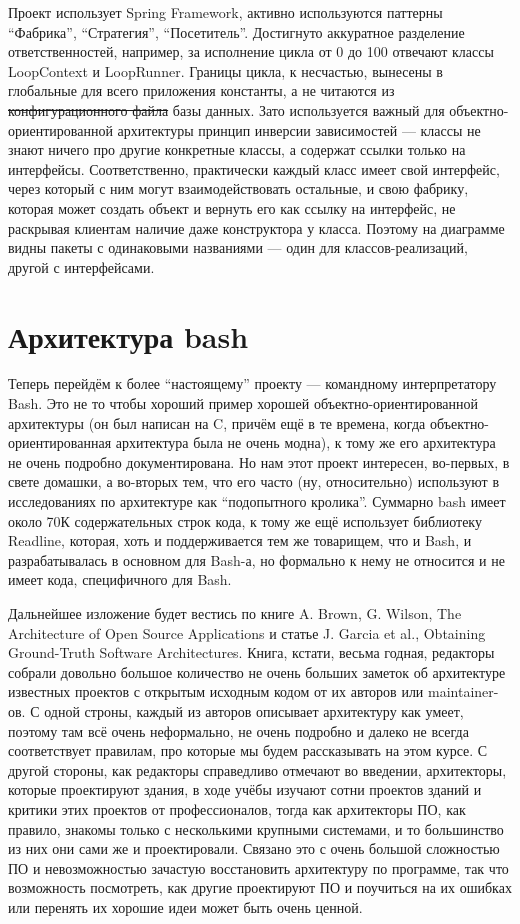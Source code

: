 \documentclass[a5paper]{article}
\begin{document}
Проект использует Spring Framework, активно используются паттерны ``Фабрика'', ``Стратегия'', ``Посетитель''. Достигнуто аккуратное разделение ответственностей, например, за исполнение цикла от 0 до 100 отвечают классы LoopContext и LoopRunner. Границы цикла, к несчастью, вынесены в глобальные для всего приложения константы, а не читаются из \sout{конфигурационного файла} базы данных. Зато используется важный для объектно-ориентированной архитектуры принцип инверсии зависимостей --- классы не знают ничего про другие конкретные классы, а содержат ссылки только на интерфейсы. Соответственно, практически каждый класс имеет свой интерфейс, через который с ним могут взаимодействовать остальные, и свою фабрику, которая может создать объект и вернуть его как ссылку на интерфейс, не раскрывая клиентам наличие даже конструктора у класса. Поэтому на диаграмме видны пакеты с одинаковыми названиями --- один для классов-реализаций, другой с интерфейсами.

\section{Архитектура bash}

Теперь перейдём к более ``настоящему'' проекту --- командному интерпретатору Bash. Это не то чтобы хороший пример хорошей объектно-ориентированной архитектуры (он был написан на C, причём ещё в те времена, когда объектно-ориентированная архитектура была не очень модна), к тому же его архитектура не очень подробно документирована. Но нам этот проект интересен, во-первых, в свете домашки, а во-вторых тем, что его часто (ну, относительно) используют в исследованиях по архитектуре как ``подопытного кролика''. Суммарно bash имеет около 70К содержательных строк кода, к тому же ещё использует библиотеку Readline, которая, хоть и поддерживается тем же товарищем, что и Bash, и разрабатывалась в основном для Bash-а, но формально к нему не относится и не имеет кода, специфичного для Bash.

Дальнейшее изложение будет вестись по книге A. Brown, G. Wilson, The Architecture of Open Source Applications и статье J. Garcia et al., Obtaining Ground-Truth Software Architectures. Книга, кстати, весьма годная, редакторы собрали довольно большое количество не очень больших заметок об архитектуре известных проектов с открытым исходным кодом от их авторов или maintainer-ов. С одной строны, каждый из авторов описывает архитектуру как умеет, поэтому там всё очень неформально, не очень подробно и далеко не всегда соответствует правилам, про которые мы будем рассказывать на этом курсе. С другой стороны, как редакторы справедливо отмечают во введении, архитекторы, которые проектируют здания, в ходе учёбы изучают сотни проектов зданий и критики этих проектов от профессионалов, тогда как архитекторы ПО, как правило, знакомы только с несколькими крупными системами, и то большинство из них они сами же и проектировали. Связано это с очень большой сложностью ПО и невозможностью зачастую восстановить архитектуру по программе, так что возможность посмотреть, как другие проектируют ПО и поучиться на их ошибках или перенять их хорошие идеи может быть очень ценной.
\end{document}
